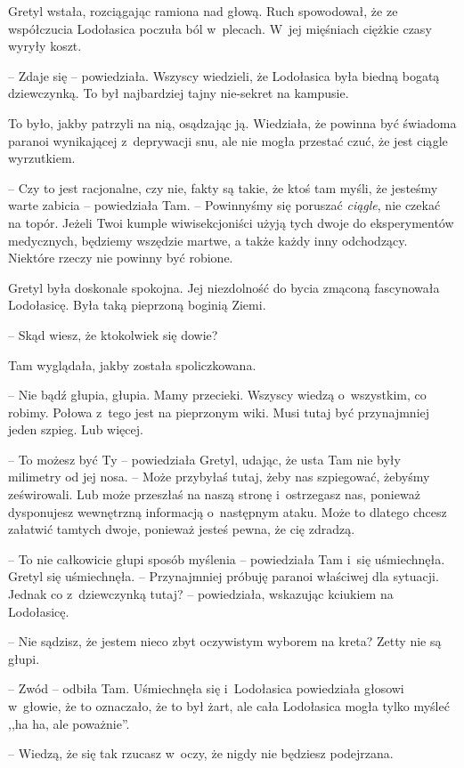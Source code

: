 \documentclass[oneside,polish,11pt,sfheadings]{mwbk}
\begin{document}
Gretyl wstała, rozciągając ramiona nad głową. Ruch spowodował, że ze
współczucia Lodołasica poczuła ból w~plecach. W~jej mięśniach ciężkie
czasy wyryły koszt.

-- Zdaje się -- powiedziała. Wszyscy wiedzieli, że Lodołasica była biedną
bogatą dziewczynką. To był najbardziej tajny nie-sekret na kampusie.

To było, jakby patrzyli na nią, osądzając ją. Wiedziała, że powinna być
świadoma paranoi wynikającej z~deprywacji snu, ale nie mogła przestać
czuć, że jest ciągle wyrzutkiem.

-- Czy to jest racjonalne, czy nie, fakty są takie, że ktoś tam myśli, że
jesteśmy warte zabicia -- powiedziała Tam. -- Powinnyśmy się poruszać
\textit{ciągle}, nie czekać na topór. Jeżeli Twoi kumple wiwisekcjoniści
użyją tych dwoje do eksperymentów medycznych, będziemy wszędzie martwe,
a także każdy inny odchodzący. Niektóre rzeczy nie powinny być robione.

Gretyl była doskonale spokojna. Jej niezdolność do bycia zmąconą
fascynowała Lodołasicę. Była taką pieprzoną boginią Ziemi. 

-- Skąd wiesz,
że ktokolwiek się dowie?

Tam wyglądała, jakby została spoliczkowana. 

-- Nie bądź głupia, głupia.
Mamy przecieki. Wszyscy wiedzą o~wszystkim, co robimy. Połowa z~tego
jest na pieprzonym wiki. Musi tutaj być przynajmniej jeden szpieg. Lub
więcej.

-- To możesz być Ty -- powiedziała Gretyl, udając, że usta Tam nie były
milimetry od jej nosa. -- Może przybyłaś tutaj, żeby nas szpiegować,
żebyśmy ześwirowali. Lub może przeszłaś na naszą stronę i~ostrzegasz
nas, ponieważ dysponujesz wewnętrzną informacją o~następnym ataku. Może
to dlatego chcesz załatwić tamtych dwoje, ponieważ jesteś pewna, że cię
zdradzą.

-- To nie całkowicie głupi sposób myślenia -- powiedziała Tam i~się
uśmiechnęła. Gretyl się uśmiechnęła. -- Przynajmniej próbuję paranoi
właściwej dla sytuacji. Jednak co z~dziewczynką tutaj? -- powiedziała,
wskazując kciukiem na Lodołasicę.

-- Nie sądzisz, że jestem nieco zbyt oczywistym wyborem na kreta? Zetty
nie są głupi.

-- Zwód -- odbiła Tam. Uśmiechnęła się i~Lodołasica powiedziała głosowi w~głowie, że to oznaczało, że to był żart, ale cała Lodołasica mogła tylko
myśleć ,,ha ha, ale poważnie''.

-- Wiedzą, że się tak rzucasz w~oczy, że nigdy nie będziesz podejrzana.
\end{document}
